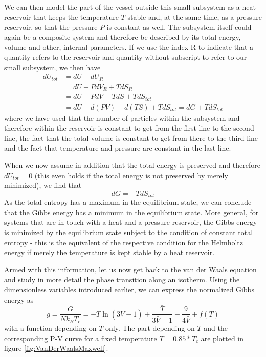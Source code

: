\documentclass[a4paper, draft]{article}
\theoremstyle{own}
\theoremstyle{remark}
\begin{document}
We can then model the part of the vessel outside this small subsystem as a heat reservoir that keeps the temperature $T$ stable and, at the same time, as a pressure reservoir, so that the pressure $P$ is constant as well. The subsystem itself could again be a composite system and therefore be described by its total energy, volume and other, internal parameters. If we use the index R to indicate that a quantity refers to the reservoir and quantity without subscript to refer to our small subsystem, we then have
\begin{align*}
dU_{tot} &= dU + dU_R  \\
&= dU - P dV_R + T dS_R \\
&= dU + P dV - T dS + T dS_{tot} \\
&= dU + d(PV) - d(TS) + TdS_{tot} = dG + TdS_{tot}
\end{align*}
where we have used that the number of particles within the subsystem and therefore within the reservoir is constant to get from the first line to the second line, the fact that the total volume is constant to get from there to the third line and the fact that temperature and pressure are constant in the last line.

When we now assume in addition that the total energy is preserved and therefore $dU_{tot} = 0$ (this even holds if the total energy is not preserved by merely minimized), we find that 
$$
dG = - T dS_{tot}
$$
As the total entropy has a maximum in the equilibrium state, we can conclude that the Gibbs energy has a minimum in the equilibrium state. More general, for systems that are in touch with a heat and a pressure reservoir, the Gibbs energy is minimized by the equilibrium state subject to the condition of constant total entropy - this is the equivalent of the respective condition for the Helmholtz energy if merely the temperature is kept stable by a heat reservoir.

Armed with this information, let us now get back to the van der Waals equation and study in more detail the phase transition along an isotherm. Using the dimensionless variables introduced earlier, we can express the normalized Gibbs energy as
$$
g = \frac{G}{N k_B T_c} = - \bar{T} \ln (3\bar{V} - 1) 
+  \frac{\bar{T}}{3\bar{V} - 1} - \frac{9}{4 \bar{V}} + f(T)
$$
with a function depending on $T$ only. The part depending on $T$ and the corresponding P-V curve for a fixed temperature $T = 0.85*T_c$ are plotted in figure \ref{fig:VanDerWaalsMaxwell}.
\end{document}
